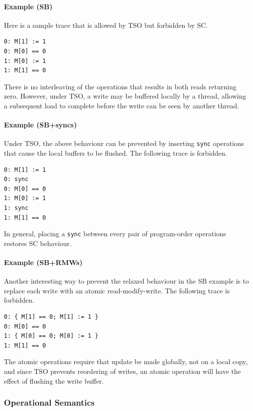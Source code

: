 \documentclass[11pt]{article}
\begin{document}
\paragraph{Example (SB)} Here is a sample trace that is allowed by
TSO but forbidden by SC.

\begin{verbatim}
0: M[1] := 1
0: M[0] == 0
1: M[0] := 1
1: M[1] == 0
\end{verbatim}

\noindent There is no interleaving of the operations that results in both reads
returning zero.  However, under TSO, a write may be buffered locally
by a thread, allowing a subsequent load to complete before the write
can be seen by another thread.

\paragraph{Example (SB+syncs)}  Under TSO, the above behaviour can be
prevented by inserting \verb!sync! operations that cause the local
buffers to be flushed.  The following trace is forbidden.

\begin{verbatim}
0: M[1] := 1
0: sync
0: M[0] == 0
1: M[0] := 1
1: sync
1: M[1] == 0
\end{verbatim}

\noindent In general, placing a \verb!sync! between every pair of program-order
operations restores SC behaviour.

\paragraph{Example (SB+RMWs)} Another interesting way to prevent the
relaxed behaviour in the SB example is to replace each write with an
atomic read-modify-write.  The following trace is forbidden.

\begin{verbatim}
0: { M[1] == 0; M[1] := 1 }
0: M[0] == 0
1: { M[0] == 0; M[0] := 1 }
1: M[1] == 0
\end{verbatim}

\noindent The atomic operations require that update be made
globally, not on a local copy, and since TSO prevents reordering of
writes, an atomic operation will have the effect of flushing the write
buffer.

\subsubsection*{Operational Semantics}
\end{document}
